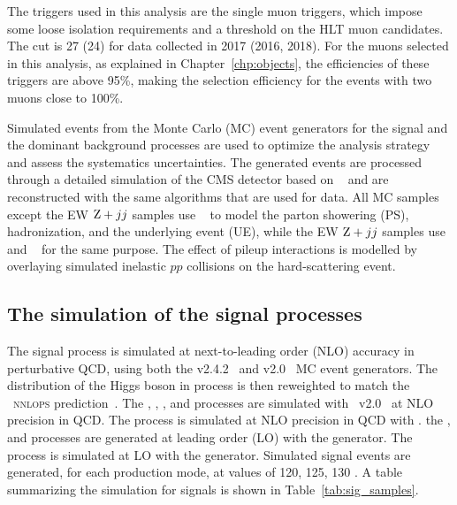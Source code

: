 The triggers used in this analysis are the single muon triggers, which impose some loose isolation requirements and a \pt threshold on the HLT muon candidates.
The \pt cut is 27 (24) \GeV for data collected in 2017 (2016, 2018). 
For the muons selected in this analysis, as explained in Chapter~\ref{chp:objects}, the efficiencies of these triggers are above 95\%, 
making the selection efficiency for the events with two muons close to 100\%.

Simulated events from the Monte Carlo (MC) event generators for the signal and the dominant background processes are used to 
optimize the analysis strategy and assess the systematics uncertainties.
The generated events are processed through a detailed simulation of the CMS detector based on \GEANTfour~\cite{AGOSTINELLI2003250}
and are reconstructed with the same algorithms that are used for data.
All MC samples except the EW $\mathrm{Z}+jj$ samples use ~\cite{SJOSTRAND2015159} to model the parton showering (PS), 
hadronization, and the underlying event (UE), while the EW $\mathrm{Z}+jj$ samples use \HERWIGpp and \HERWIGSeven~\cite{Bellm:2015jjp} for the same purpose.
The effect of pileup interactions is modelled by overlaying simulated inelastic $pp$ collisions on the hard-scattering event.

\bigskip
\subsection{The simulation of the signal processes}
The \ggH signal process is simulated at next-to-leading order (NLO) accuracy in perturbative QCD, using both the \MGvATNLO v2.4.2~\cite{Alwall:2014hca}
and \POWHEG v2.0~\cite{Nason_2004, Frixione_2007, Alioli:2010xd, Bagnaschi:2011tu} MC event generators. 
The \pt distribution of the Higgs boson in \ggH process is then reweighted to match the \POWHEG~\textsc{nnlops} prediction~\cite{Hamilton:2013fea,Hamilton:2015nsa}. 
The \qqH, \WH, \qqZH, and \ttH processes are simulated with \POWHEG~v2.0~\cite{Nason:2009ai,Luisoni:2013kna,Hartanto:2015uka} at NLO precision in QCD. 
The \bbH process is simulated at NLO precision in QCD with \POWHEG.
the \tHq, and \tHW processes are generated at leading order (LO) with the \MGvATNLO generator.
The \ggZH process is simulated at LO with the \POWHEG generator.
Simulated signal events are generated, for each production mode, at \mh values of 120, 125, 130 \GeV.
A table summarizing the simulation for signals is shown in Table~\ref{tab:sig_samples}.

